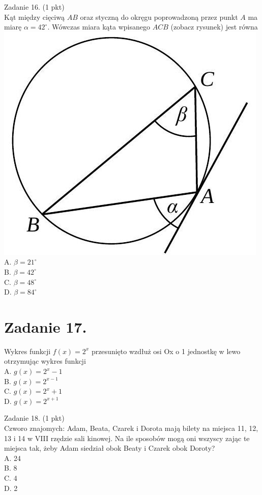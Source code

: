 \documentclass[10pt]{article}
\begin{document}
Zadanie 16. (1 pkt)\\
Kąt między cięciwą \(A B\) oraz styczną do okręgu poprowadzoną przez punkt \(A\) ma miarę \(\alpha=42^{\circ}\). Wówczas miara kąta wpisanego \(A C B\) (zobacz rysunek) jest równa\\
\includegraphics[max width=\textwidth, center]{2024_11_21_6438f6dbc3784fe6d1deg-06}\\
A. \(\beta=21^{\circ}\)\\
B. \(\beta=42^{\circ}\)\\
C. \(\beta=48^{\circ}\)\\
D. \(\beta=84^{\circ}\)

\section*{Zadanie 17.}
Wykres funkcji \(f(x)=2^{x}\) przesunięto wzdłuż osi Ox o 1 jednostkę w lewo otrzymując wykres funkcji\\
A. \(g(x)=2^{x}-1\)\\
B. \(g(x)=2^{x-1}\)\\
C. \(g(x)=2^{x}+1\)\\
D. \(g(x)=2^{x+1}\)

Zadanie 18. (1 pkt)\\
Czworo znajomych: Adam, Beata, Czarek i Dorota mają bilety na miejsca 11, 12, 13 i 14 w VIII rzędzie sali kinowej. Na ile sposobów mogą oni wszyscy zając te miejsca tak, żeby Adam siedział obok Beaty i Czarek obok Doroty?\\
A. 24\\
B. 8\\
C. 4\\
D. 2
\end{document}
